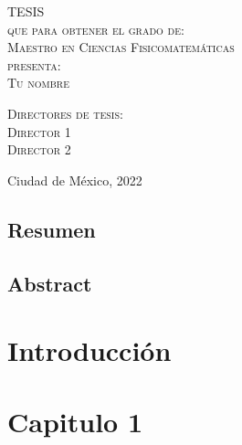 \documentclass[12pt, twoside]{book}
\theoremstyle{definition}
\begin{document}
\begin{titlepage}
\begin{minipage}[c][0.81\textheight][t]{0.75\textwidth}
\begin{center}
                \vspace{2cm}            

                \textsc{\LARGE T\hspace{1.5cm}E\hspace{1.5cm}S\hspace{1.5cm}I\hspace{1.5cm}S}\\[0.5cm]
                \textsc{\large que para obtener el grado de:}\\[0.5cm]
                \textsc{\large Maestro en Ciencias Fisicomatemáticas}\\[0.5cm]
                \textsc{\large presenta:}\\[0.5cm]
                \textsc{\large {Tu nombre}}\\[2cm]          

                \vspace{0.5cm}

                {\large\scshape Directores de tesis:\\[0.3cm] {Director 1 \\[0.2cm]
        
                Director 2}}\\[.2in]

                \vspace{0.5cm}

                \large{Ciudad de México,}{ }{2022}
            \end{center}
        \end{minipage}
    \end{titlepage}

\section*{Resumen}




\clearpage
\section*{Abstract}


\tableofcontents

\chapter*{Introducci\'on}


\chapter{Capitulo 1}

\end{document}

